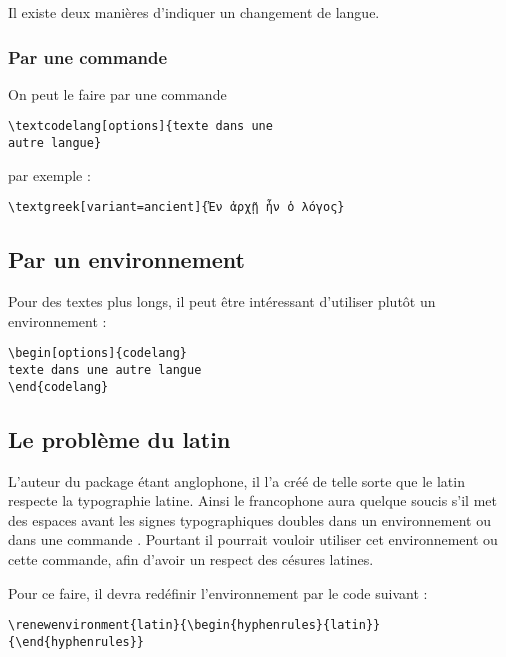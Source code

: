 Il existe deux manières d'indiquer un changement de langue.

\subsubsection{Par une commande}

On peut le faire par une commande 
\begin{verbatim}
\textcodelang[options]{texte dans une
autre langue}
\end{verbatim}

 par exemple : 

\begin{verbatim}
\textgreek[variant=ancient]{Ἐν ἀρχῇ ἦν ὁ λόγος}
\end{verbatim}

\subsection{Par un environnement}

Pour des textes plus longs, il peut être intéressant d'utiliser plutôt un environnement :

\begin{verbatim}
\begin[options]{codelang}
texte dans une autre langue
\end{codelang}
\end{verbatim}

\subsection{Le problème du latin}

L'auteur du package  étant anglophone, il l'a créé de telle sorte que le latin respecte la typographie latine. Ainsi le francophone aura quelque soucis s'il met des espaces avant les signes typographiques doubles dans un environnement  ou dans une commande .
Pourtant il pourrait vouloir utiliser cet environnement ou cette commande, afin d'avoir un respect des césures latines.

Pour ce faire, il devra redéfinir l'environnement  par le code suivant :

\begin{verbatim}
\renewenvironment{latin}{\begin{hyphenrules}{latin}}{\end{hyphenrules}}
\end{verbatim}

